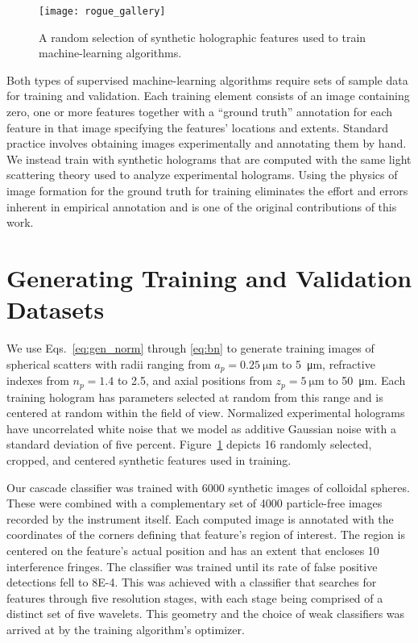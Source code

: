 \begin{figure}[b!]
  \centering
  \texttt{[image: rogue\_gallery]}	
  \caption{ A random selection of synthetic
  holographic features used to train machine-learning algorithms.} 
  \label{fig:rogue_gallery}
\end{figure}

Both types of supervised machine-learning algorithms 
require sets of sample data for training and validation.
Each training element
consists of an image containing
zero, one or more features together with
a ``ground truth'' annotation for each feature in that image
specifying the features' locations and extents.
Standard practice involves obtaining images experimentally
and annotating them by hand.
We instead train with synthetic holograms that are 
computed with the same light scattering theory \cite{lee07a}
used to analyze experimental holograms.
Using the physics of image formation
for the ground truth for training eliminates 
the effort and errors inherent in empirical annotation and is
one of the original contributions of this work.

\section{Generating Training and Validation Datasets}


We use Eqs.~\eqref{eq:gen_norm} through \eqref{eq:bn} to generate training 
images of spherical scatters with radii ranging from 
$a_p = \SI{0.25}{\um}$ to \SI{5}{\um}, refractive indexes from 
$n_p = \num{1.4}$ to \num{2.5}, and axial positions from 
$z_p = \SI{5}{\um}$ to \SI{50}{\um}. 
Each training hologram has parameters selected at 
random from this 
range and is centered at random within
the field of view.
Normalized experimental holograms have uncorrelated white
noise that we model as additive Gaussian noise with a standard
deviation of five percent. Figure~\ref{fig:rogue_gallery} depicts
\num{16} randomly selected, cropped, and centered synthetic features
used in training.

Our cascade classifier was trained with \num{6000}
synthetic images of colloidal spheres.
These were combined with a complementary set of 
\num{4000} particle-free images recorded by the instrument itself.
Each computed image is annotated with
the coordinates of the corners defining that feature's region of
interest.
The region is centered on the feature's actual position
and has an extent that encloses 10 interference fringes.
The classifier was trained
until its rate of false positive detections
fell to \num{8E-4}.
This was achieved with a classifier that searches for features
through five resolution stages, with each stage being
comprised of a distinct set of five wavelets.
This geometry and the choice of weak classifiers was arrived at
by the training algorithm's optimizer.

